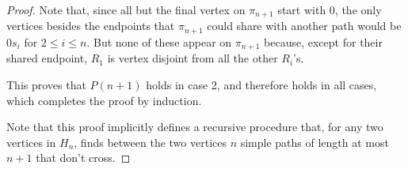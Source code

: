 \documentclass[14pt]{extarticle}
\begin{document}
\begin{proof}
Note that, since all but the final vertex on $\pi_{n+1}$ start with 0, the only vertices besides the endpoints that $\pi_{n+1}$ could share with another path would be $0s_i$ for $2 \leq i \leq n$. But none of these appear on $\pi_{n+1}$ because, except for their shared endpoint, $R_1$ is vertex disjoint from all the other $R_i$’s. 

This proves that $P (n + 1)$ holds in case 2, and therefore holds in all cases, which completes the proof by induction. 

Note that this proof implicitly defines a recursive procedure that, for any two vertices in $H_n$, finds between the two vertices $n$ simple paths of length at most $n + 1$ that don’t cross.
\end{proof}
\end{document}
